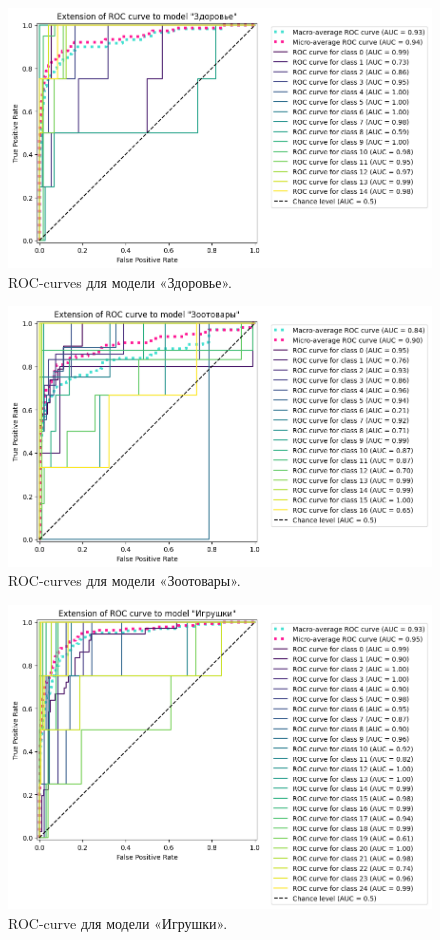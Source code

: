 \documentclass[a4paper,12pt]{extarticle}
\begin{document}
\begin{figure}[hbtp]
	\centering
	\includegraphics[scale=0.7]{roc_curves/roccurve_Здоровье.png}
	\caption{ROC-curves для модели «Здоровье».}
	\label{fig:roccurve_Здоровье}
\end{figure}

\begin{figure}[hbtp]
	\centering
	\includegraphics[scale=0.7]{roc_curves/roccurve_Зоотовары.png}
	\caption{ROC-curves для модели «Зоотовары».}
	\label{fig:roccurve_Зоотовары}
\end{figure}

\begin{figure}[hbtp]
	\centering
	\includegraphics[scale=0.7]{roc_curves/roccurve_Игрушки.png}
	\caption{ROC-curve для модели «Игрушки».}
	\label{fig:roccurve_Игрушки}
\end{figure}
\end{document}
